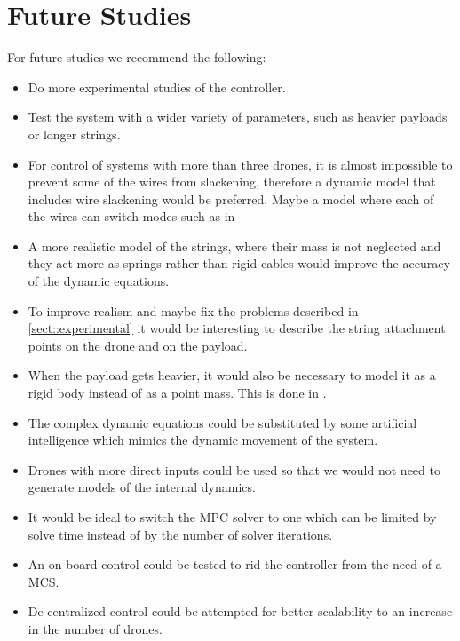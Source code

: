 \section{Future Studies}
For future studies we recommend the following:
\begin{itemize}
	\item Do more experimental studies of the controller.
	\item Test the system with a wider variety of parameters, such as heavier payloads or longer strings.
	\item For control of systems with more than three drones, it is almost impossible to prevent some of the wires from slackening, therefore a dynamic model that includes wire slackening would be preferred. Maybe a model where each of the wires can switch modes such as in \cite{Bisgaard2009}
	\item A more realistic model of the strings, where their mass is not neglected and they act more as springs rather than rigid cables would improve the accuracy of the dynamic equations.
	\item To improve realism and maybe fix the problems described in \cref{sect::experimental} it would be interesting to describe the string attachment points on the drone and on the payload.
	\item When the payload gets heavier, it would also be necessary to model it as a rigid body instead of as a point mass. This is done in \cite{Lee2014}.
	\item The complex dynamic equations could be substituted by some artificial intelligence which mimics the dynamic movement of the system.
	\item Drones with more direct inputs could be used so that we would not need to generate models of the internal dynamics.
	\item It would be ideal to switch the \ac{MPC} solver to one which can be limited by solve time instead of by the number of solver iterations.	
	\item An on-board control could be tested to rid the controller from the need of a \ac{MCS}.
	\item De-centralized control could be attempted for better scalability to an increase in the number of drones.
\end{itemize}
